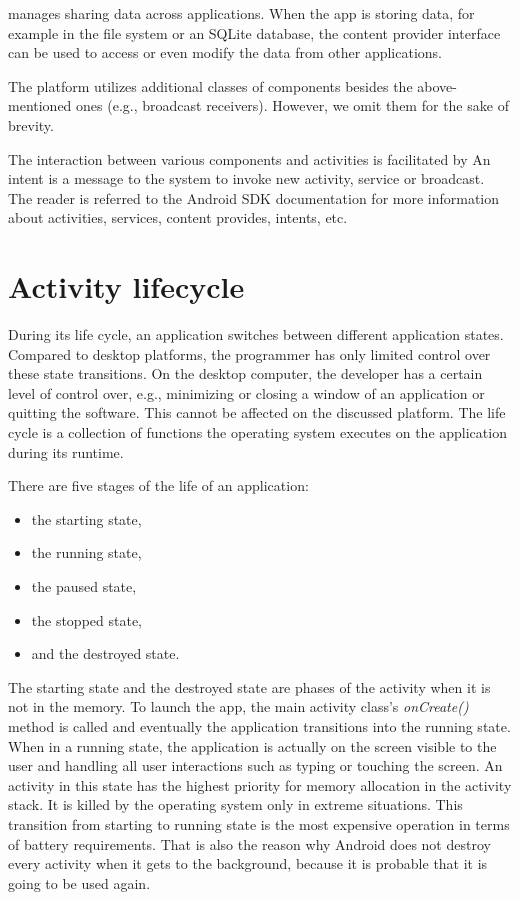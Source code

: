  manages sharing data across applications.
When the app is storing data, for example in the file system or an SQLite database, the content provider interface can be used to access or even modify the data from other applications. 

The platform utilizes additional classes of components besides the above-mentioned ones (e.g., broadcast receivers). 
However, we omit them for the sake of brevity. 

The interaction between various components and activities is facilitated by  
An intent is a message to the system to invoke new activity, service or broadcast.
The reader is referred to the Android SDK documentation for more information about activities, services, content provides, intents, etc. 

\section{Activity lifecycle}
\label{sec:lifecycle}

During its life cycle, an application switches between different application states.
Compared to desktop platforms, the programmer has only limited control over these state transitions.
On the desktop computer, the developer has a certain level of control over, e.g., minimizing or closing a window of an application or quitting the software. 
This cannot be affected on the discussed platform. 
The life cycle is a collection of functions the operating system executes on the application during its runtime. 

There are five stages of the life of an application:
\begin{itemize}
\item the starting state,
\item the running state,
\item the paused state,
\item the stopped state,
\item and the destroyed state.
\end{itemize}

The starting state and the destroyed state are phases of the activity when it is not in the memory.
To launch the app, the main activity class's \emph{onCreate()} method is called and eventually the application transitions into the running state.
When in a running state, the application is actually on the screen visible to the user and handling all user interactions such as typing or touching the screen. 
An activity in this state has the highest priority for memory allocation in the activity stack.
It is killed by the operating system only in extreme situations.
This transition from starting to running state is the most expensive operation in terms of battery requirements.
That is also the reason why Android does not destroy every activity when it gets to the background, 
because it is probable that it is going to be used again. 

